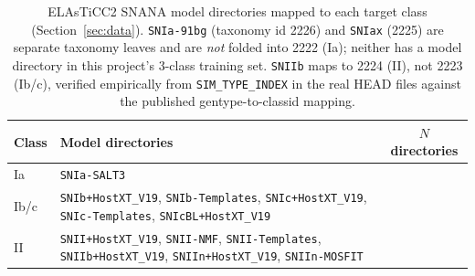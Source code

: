 \begin{table}[htb]
\centering
\caption{ELAsTiCC2 SNANA model directories mapped to each target class
(Section~\ref{sec:data}). \texttt{SNIa-91bg} (taxonomy id 2226) and
\texttt{SNIax} (2225) are separate taxonomy leaves and are \emph{not}
folded into 2222 (Ia); neither has a model directory in this project's
3-class training set. \texttt{SNIIb} maps to 2224 (II), not 2223 (Ib/c),
verified empirically from \texttt{SIM\_TYPE\_INDEX} in the real HEAD files
against the published gentype-to-classid mapping.}
\label{tab:modeldirs}
\begin{tabular}{L{2cm}L{9.5cm}c}
\toprule
Class & Model directories & $N$ directories \\
\midrule
Ia & \texttt{SNIa-SALT3} & \TierANumDirsIa{} \\
Ib/c & \texttt{SNIb+HostXT\_V19}, \texttt{SNIb-Templates},
  \texttt{SNIc+HostXT\_V19}, \texttt{SNIc-Templates},
  \texttt{SNIcBL+HostXT\_V19} & \TierANumDirsIbc{} \\
II & \texttt{SNII+HostXT\_V19}, \texttt{SNII-NMF},
  \texttt{SNII-Templates}, \texttt{SNIIb+HostXT\_V19},
  \texttt{SNIIn+HostXT\_V19}, \texttt{SNIIn-MOSFIT} & \TierANumDirsII{} \\
\bottomrule
\end{tabular}
\end{table}

